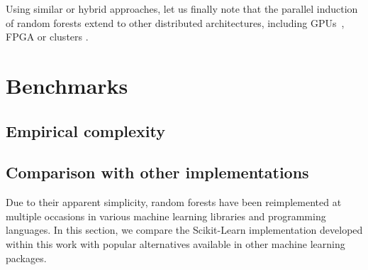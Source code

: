 Using similar or hybrid approaches, let us finally note that the parallel
induction of random forests extend to other distributed architectures,
including GPUs~\citep{sharp:2008,liao:2013}, FPGA \citep{narayanan:2007} or
clusters \citep{mitchell:2011}.



\section{Benchmarks}
\label{sec:5:benchmarks}

\subsection{Empirical complexity}

\todo{}








\subsection{Comparison with other implementations}

Due to their apparent simplicity, random forests have been reimplemented at
multiple occasions in various machine learning libraries and programming
languages. In this section, we compare the Scikit-Learn implementation
developed within this work with popular alternatives available in other machine
learning packages.

